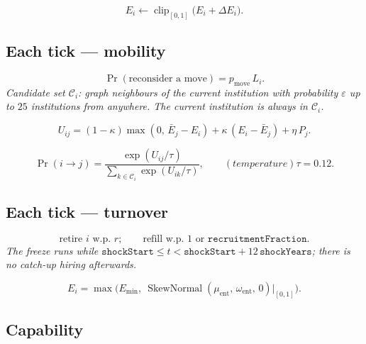 \documentclass[11pt]{article}
\newcommand{\eqnote}[1]{{\small\itshape #1}\par\addvspace{4pt}}
\begin{document}
\begin{equation}\label{eq:E12}
  E_i \leftarrow \operatorname{clip}_{[0,1]}\!\bigl(E_i + \Delta E_i\bigr).
\end{equation}

\subsection*{Each tick --- mobility}

\begin{equation}\label{eq:E13}
  \Pr(\text{reconsider a move}) = p_{\text{move}}\, L_i .
\end{equation}
\eqnote{Candidate set $\mathcal{C}_i$: graph neighbours of the current
institution with probability $\varepsilon$ up to $25$
institutions from anywhere. The current institution is always in
$\mathcal{C}_i$.}

\begin{equation}\label{eq:E14}
  U_{ij} = (1-\kappa)\max(0,\, \bar E_j - E_i)
         + \kappa\,(E_i - \bar E_j)
         + \eta\, P_j .
\end{equation}

\begin{equation}\label{eq:E15}
  \Pr(i \to j) = \frac{\exp(U_{ij}/\tau)}
                      {\sum_{k \in \mathcal{C}_i} \exp(U_{ik}/\tau)},
  \qquad (temperature) \tau = 0.12 .
\end{equation}

\subsection*{Each tick --- turnover}

\begin{equation}\label{eq:E16}
  \text{retire } i \text{ w.p. } r; \qquad
  \text{refill w.p. } 1 \text{ or } \texttt{recruitmentFraction}.
\end{equation}
\eqnote{The freeze runs while
$\texttt{shockStart} \le t < \texttt{shockStart} + 12\,\texttt{shockYears}$; there
is no catch-up hiring afterwards.}

\begin{equation}\label{eq:E17}
  E_i = \max\!\bigl(E_{\min},\
        \operatorname{SkewNormal}(\mu_{\text{ent}},\, \omega_{\text{ent}},\, 0)
        \big|_{[0,1]}\bigr).
\end{equation}


\subsection*{Capability}
\end{document}
